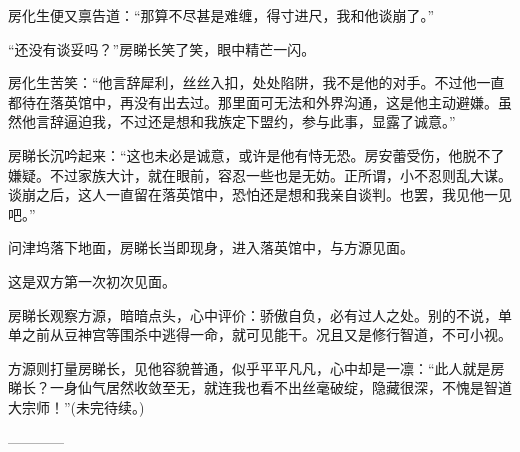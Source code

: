 \begin{this_body}
房化生便又禀告道：“那算不尽甚是难缠，得寸进尺，我和他谈崩了。”

“还没有谈妥吗？”房睇长笑了笑，眼中精芒一闪。

房化生苦笑：“他言辞犀利，丝丝入扣，处处陷阱，我不是他的对手。不过他一直都待在落英馆中，再没有出去过。那里面可无法和外界沟通，这是他主动避嫌。虽然他言辞逼迫我，不过还是想和我族定下盟约，参与此事，显露了诚意。”

房睇长沉吟起来：“这也未必是诚意，或许是他有恃无恐。房安蕾受伤，他脱不了嫌疑。不过家族大计，就在眼前，容忍一些也是无妨。正所谓，小不忍则乱大谋。谈崩之后，这人一直留在落英馆中，恐怕还是想和我亲自谈判。也罢，我见他一见吧。”

问津坞落下地面，房睇长当即现身，进入落英馆中，与方源见面。

这是双方第一次初次见面。

房睇长观察方源，暗暗点头，心中评价：骄傲自负，必有过人之处。别的不说，单单之前从豆神宫等围杀中逃得一命，就可见能干。况且又是修行智道，不可小视。

方源则打量房睇长，见他容貌普通，似乎平平凡凡，心中却是一凛：“此人就是房睇长？一身仙气居然收敛至无，就连我也看不出丝毫破绽，隐藏很深，不愧是智道大宗师！”(未完待续。)

------------

\end{this_body}

